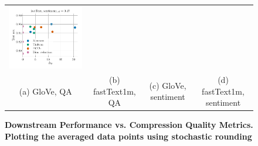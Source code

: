 \begin{figure}
\begin{tabular}{@{\hskip -0.0in}c@{\hskip -0.0in}c@{\hskip -0.0in}c@{\hskip -0.0in}c@{\hskip -0.0in}}
		\includegraphics[width=.245\linewidth]{figures/fasttext1m_sentiment_sst_test-acc_vs_gram-large-dim-delta2-2_linx_stoc_ave-pt.pdf} \\
		(a) GloVe, QA & (b) fastText1m, QA  & (c) GloVe, sentiment & (d) fastText1m, sentiment
	\end{tabular}
	\caption{
		\textbf{Downstream Performance vs. Compression Quality Metrics. Plotting the averaged data points using stochastic rounding}}
	\label{fig:bad_correlation_stoc_ave}
\end{figure}


